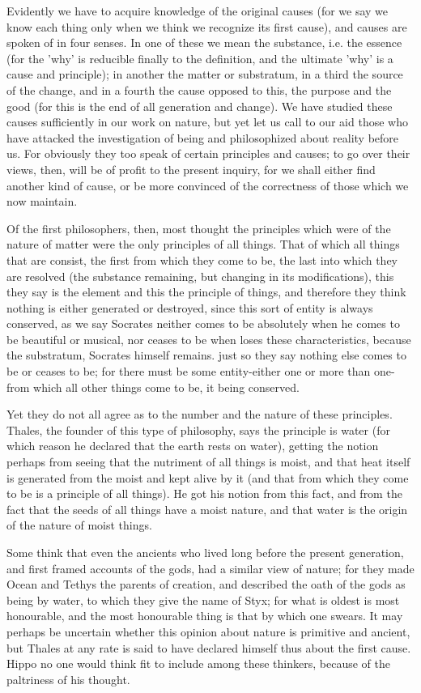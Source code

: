 \documentclass[oneside, 17pt, dvipsnames]{extbook}
\begin{document}
Evidently we have to acquire knowledge of the original causes (for we say we know each thing only when we think we recognize its first cause), and causes are spoken of in four senses. In one of these we mean the substance, i.e. the essence (for the 'why' is reducible finally to the definition, and the ultimate 'why' is a cause and principle); in another the matter or substratum, in a third the source of the change, and in a fourth the cause opposed to this, the purpose and the good (for this is the end of all generation and change). We have studied these causes sufficiently in our work on nature, but yet let us call to our aid those who have attacked the investigation of being and philosophized about reality before us. For obviously they too speak of certain principles and causes; to go over their views, then, will be of profit to the present inquiry, for we shall either find another kind of cause, or be more convinced of the correctness of those which we now maintain.

Of the first philosophers, then, most thought the principles which were of the nature of matter were the only principles of all things. That of which all things that are consist, the first from which they come to be, the last into which they are resolved (the substance remaining, but changing in its modifications), this they say is the element and this the principle of things, and therefore they think nothing is either generated or destroyed, since this sort of entity is always conserved, as we say Socrates neither comes to be absolutely when he comes to be beautiful or musical, nor ceases to be when loses these characteristics, because the substratum, Socrates himself remains. just so they say nothing else comes to be or ceases to be; for there must be some entity-either one or more than one-from which all other things come to be, it being conserved.

Yet they do not all agree as to the number and the nature of these principles. Thales, the founder of this type of philosophy, says the principle is water (for which reason he declared that the earth rests on water), getting the notion perhaps from seeing that the nutriment of all things is moist, and that heat itself is generated from the moist and kept alive by it (and that from which they come to be is a principle of all things). He got his notion from this fact, and from the fact that the seeds of all things have a moist nature, and that water is the origin of the nature of moist things.

Some think that even the ancients who lived long before the present generation, and first framed accounts of the gods, had a similar view of nature; for they made Ocean and Tethys the parents of creation, and described the oath of the gods as being by water, to which they give the name of Styx; for what is oldest is most honourable, and the most honourable thing is that by which one swears. It may perhaps be uncertain whether this opinion about nature is primitive and ancient, but Thales at any rate is said to have declared himself thus about the first cause. Hippo no one would think fit to include among these thinkers, because of the paltriness of his thought.
\end{document}
